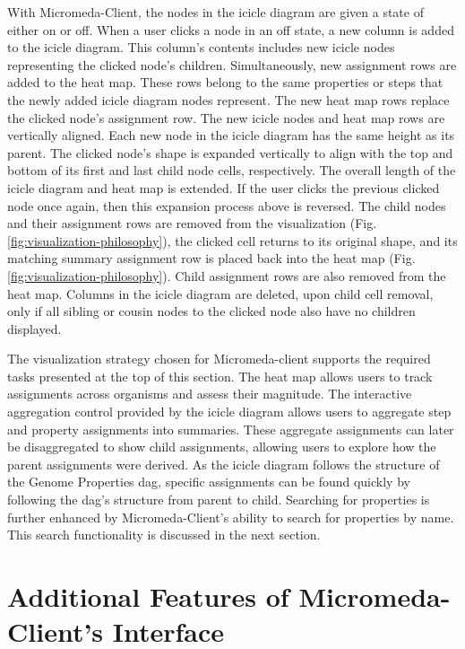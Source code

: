With Micromeda-Client, the nodes in the icicle diagram are given a state of 
either on or off. When a user clicks a node in an off state, a new column is 
added to the icicle diagram. This column's contents includes new icicle nodes 
representing the clicked node's children. Simultaneously, new assignment rows 
are added to the heat map. These rows belong to the same properties or steps 
that the newly added icicle diagram nodes represent. The new heat map rows 
replace the clicked node's assignment row. The new icicle nodes and heat map 
rows are vertically aligned. Each new node in the icicle diagram has the same 
height as its parent. The clicked node's shape is expanded vertically to align 
with the top and bottom of its first and last child node cells, respectively. 
The overall length of the icicle diagram and heat map is extended. If the user 
clicks the previous clicked node once again, then this expansion process above 
is reversed. The child nodes and their assignment rows are removed from the 
visualization (Fig. \ref{fig:visualization-philosophy}), the clicked cell 
returns to its original shape, and its matching summary assignment row is placed 
back into the heat map (Fig. \ref{fig:visualization-philosophy}). Child 
assignment rows are also removed from the heat map. Columns in the icicle 
diagram are deleted, upon child cell removal, only if all sibling or cousin 
nodes to the clicked node also have no children displayed.

The visualization strategy chosen for Micromeda-client supports the required 
tasks presented at the top of this section. The heat map allows users to track 
assignments across organisms and assess their magnitude. The interactive 
aggregation control provided by the icicle diagram allows users to aggregate 
step and property assignments into summaries. These aggregate assignments can 
later be disaggregated to show child assignments, allowing users to explore how 
the parent assignments were derived. As the icicle diagram follows the structure 
of the Genome Properties \gls{dag}, specific assignments can be found quickly by 
following the \gls{dag}'s structure from parent to child. Searching for 
properties is further enhanced by Micromeda-Client's ability to search for 
properties by name. This search functionality is discussed in the next section.

\section{Additional Features of Micromeda-Client's Interface} 
\label{client-additional-features}

